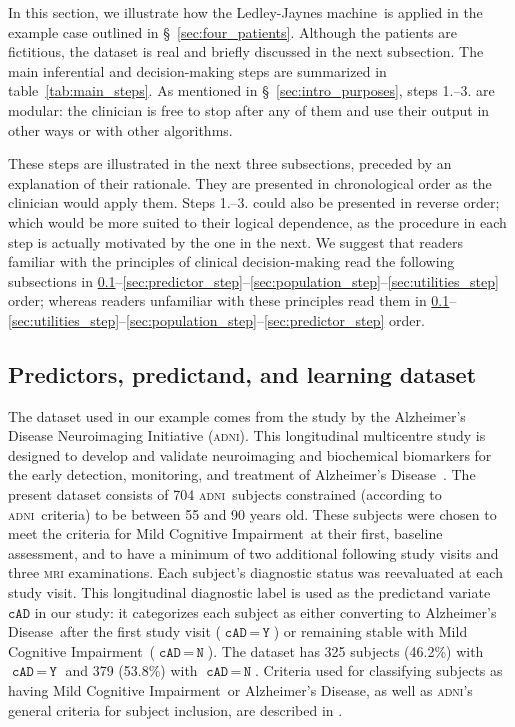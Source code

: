 \documentclass[utf8]{FrontiersinHarvard} %
\newcommand*{\mo}[1][=]{\mathord{\,#1\,}}
\newcommand*{\sect}{\S}%
\renewcommand*{\|}[1][]{\nonscript\:#1\vert\nonscript\:\mathopen{}}
\newcommand*{\cad}{\texttt{cAD}}
\newcommand*{\yes}{\texttt{Y}}
\newcommand*{\no}{\texttt{N}}
\newcommand*{\ad}{Alzheimer's Disease}
\newcommand*{\mci}{Mild Cognitive Impairment}
\newcommand*{\ljm}{Ledley-Jaynes machine}
\newcommand*{\adni}{\textsc{adni}}
\begin{document}
In this section, we illustrate how the \ljm\ is applied in the example case outlined in \sect~\ref{sec:four_patients}. Although the patients are fictitious, the dataset is real and briefly discussed in the next subsection. The main inferential and decision-making steps are summarized in table~\ref{tab:main_steps}. As mentioned in \sect~\ref{sec:intro_purposes}, steps 1.--3. are modular: the clinician is free to stop after any of them and use their output in other ways or with other algorithms.


These steps are illustrated in the next three subsections, preceded by an explanation of their rationale. They are presented in chronological order as the clinician would apply them. %
Steps 1.--3. could also be presented in reverse order; which would be more suited to their logical dependence, as the procedure in each step is actually motivated by the one in the next. We suggest that readers familiar with the principles of clinical decision-making read the following subsections in \ref{sec:dataset}--\ref{sec:predictor_step}--\ref{sec:population_step}--\ref{sec:utilities_step} order; whereas readers unfamiliar with these principles read them in \ref{sec:dataset}--\ref{sec:utilities_step}--\ref{sec:population_step}--\ref{sec:predictor_step} order.


\setcounter{subsection}{-1}
\subsection{Predictors, predictand, and learning dataset}
\label{sec:dataset}

The dataset used in our example comes from the study by the Alzheimer's Disease Neuroimaging Initiative (\adni). This longitudinal multicentre study is designed to develop and validate neuroimaging and biochemical biomarkers for the early detection, monitoring, and treatment of \ad\ \citep{petersenetal2010}. The present dataset consists of 704 \adni\ subjects constrained (according to \adni\ criteria) to be between 55 and 90 years old. These subjects were chosen to meet the criteria for \mci\ at their first, baseline assessment, and to have a minimum of two additional following study visits and three \textsc{mri} examinations. Each subject's diagnostic status was reevaluated at each study visit. This longitudinal diagnostic label is used as the predictand variate $\cad$ in our study: it categorizes each subject as either converting to \ad\ after the first study visit ($\cad\mo\yes$) or remaining stable with \mci\ ($\cad\mo\no$). The dataset has 325 subjects (46.2\%) with $\cad\mo\yes$ and 379 (53.8\%) with $\cad\mo\no$. Criteria used for classifying subjects as having \mci\ or \ad, as well as \adni's general criteria for subject inclusion, are described in \citet{mckhannetal1984,petersenetal2010}.
\end{document}
